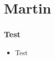 \section{Martin}
	\begin{frame}
		\frametitle{Test}
	\begin{itemize}
		\item Test
	\end{itemize}
\end{frame}
